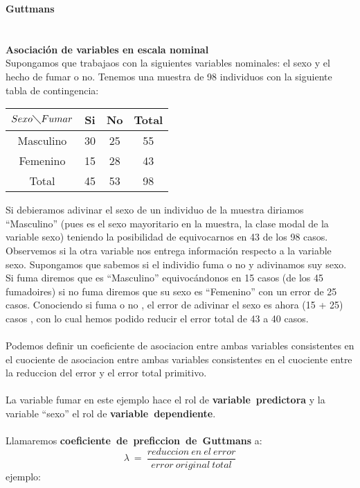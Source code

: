 \documentclass[letterpaper,spanish,11pt]{article}
\begin{document}
\textbf{Guttmans}\\\\\\

\textbf{Asociaci\'on de variables en escala nominal}\\
	Supongamos que trabajaos con la siguientes variables nominales: el sexo y el hecho de fumar o no.
	Tenemos una muestra de 98 individuos con la siguiente tabla de contingencia:\\
	\begin{center}
     \begin{tabular}{ | c | c | c | c | }
        \hline
        $Sexo \diagdown Fumar$ & Si & No & Total \\
        \hline	
          Masculino & 30 & 25 & 55 \\
          Femenino  & 15 & 28 & 43 \\
          Total     & 45 & 53 & 98 \\
        \hline
     \end{tabular}
	\end{center}
	Si debieramos adivinar el sexo de un individuo de la muestra diriamos ``Masculino'' (pues es el sexo mayoritario en la muestra, la clase
	modal de la variable sexo) teniendo la posibilidad de equivocarnos en 43 de los 98 casos. Observemos si la otra variable nos entrega
	informaci\'on respecto a la variable sexo. Supongamos que sabemos si el individio fuma o no y adivinamos suy sexo.
	Si fuma diremos que es ``Masculino'' equivoc\'andonos en 15 casos (de los 45 fumadoires) si no fuma diremos que su sexo es ``Femenino'' con un error
	de 25 casos. Conociendo si fuma o no , el error de adivinar el sexo es ahora (15 + 25) casos , con lo cual hemos podido reducir el error total
	de 43 a 40 casos.\\\\
	Podemos definir un coeficiente de asociacion entre ambas variables consistentes en el cuociente de asociacion entre ambas variables
	consistentes en el cuociente entre la reduccion del error y el error total primitivo.\\\\
	La variable fumar en este ejemplo hace el rol de \textbf{variable\ predictora} y la variable ``sexo'' el rol de \textbf{variable\ dependiente}.\\\\
	Llamaremos \textbf{coeficiente\ de\ preficcion\ de\ Guttmans} a:
	$$\lambda\ =\ \frac{reduccion\ en\ el\ error}{error\ original\ total}$$
	ejemplo:\\
\end{document}

